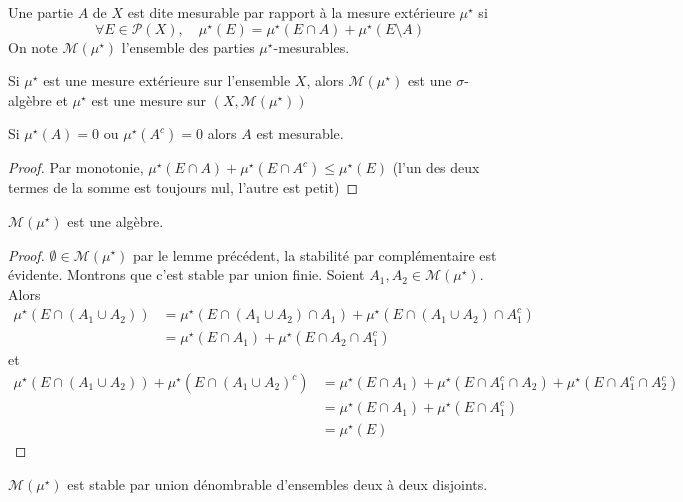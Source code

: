 \begin{dfn}
Une partie $A$ de  $X$ est dite mesurable par rapport à  la mesure extérieure $\mu^\star$ si  \[
    \forall  E \in  \mathcal  P(X), \quad  \mu^\star(E)=\mu^\star(E\cap A)+\mu^\star(E \setminus  A)
\] 
On note $\mathcal  M(\mu^\star)$ l'ensemble des parties $\mu^\star$-mesurables.
\end{dfn}


 \begin{thm}
     Si $\mu^\star$ est une mesure extérieure sur l'ensemble  $X$, alors  $\mathcal M(\mu^\star)$ est une $\sigma$-algèbre et  $\mu^\star$ est une mesure sur $(X, \mathcal  M(\mu^\star ))$
\end{thm}

\begin{lmm}
    Si $\mu^\star(A)=0$ ou  $\mu^\star(A^c)=0$ alors  $A$ est mesurable.
\end{lmm}

\begin{proof}
    Par monotonie, $\mu^\star(E\cap A)+\mu^\star(E\cap A^c)\leq \mu^\star(E)$ (l'un des deux termes de la somme est toujours nul, l'autre est petit)
\end{proof}

\begin{lmm}
    $\mathcal M(\mu^\star)$ est une algèbre.
\end{lmm}

\begin{proof}
    $\emptyset \in  \mathcal  M(\mu^\star)$ par le lemme précédent, la stabilité par complémentaire est évidente. Montrons que c'est stable par union finie. Soient $A_1, A_2 \in  \mathcal M(\mu^\star)$. Alors \begin{align*}
        \mu^\star(E\cap (A_1\cup A_2))&=\mu^\star(E\cap (A_1\cup A_2)\cap A_1)+\mu^\star(E\cap (A_1\cup A_2)\cap A_1^c)\\&=\mu^\star(E\cap A_1)+\mu^\star(E\cap A_2\cap A_1^c)
    \end{align*}
    et \begin{align*}
        \mu^\star(E\cap (A_1\cup A_2))+\mu^\star(E\cap (A_1\cup A_2)^c) &= \mu^\star(E\cap A_1)+\mu^\star(E\cap A_1^c\cap A_2)+\mu^\star(E\cap A_1^c\cap A_2^c)\\&=\mu^\star(E\cap A_1)+\mu^\star(E\cap A_1^c)\\&=\mu^\star(E)
    \end{align*}
\end{proof}

\begin{lmm}
    $\mathcal  M(\mu^\star)$ est stable par union dénombrable d'ensembles deux à deux disjoints.
\end{lmm}

